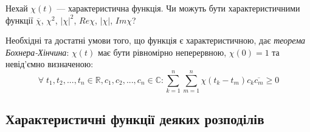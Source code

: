 \begin{exercise}
    Нехай $\chi(t)$ --- характеристична функція. Чи можуть бути характеристичними функції $\overline{\chi}$, $\chi^2$, $|\chi|^2$, ${Re}\chi$, $|\chi|$, ${Im}\chi$? 
\end{exercise}

Необхідні та достатні умови того, що функція є характеристичною, дає
\emph{теорема Бохнера-Хінчина}: $\chi(t)$ має бути рівномірно неперервною, $\chi(0) = 1$ та 
невід'ємно визначеною: $$
    \forall \; t_1, t_2, ..., t_n \in \mathbb{R}, c_1, c_2, ..., c_n \in \mathbb{C}: 
    \sum\limits_{k=1}^n {\sum\limits_{m=1}^n \chi(t_k - t_m) c_k \overline{c_m}} \geq 0
$$

\subsection{Характеристичні функції деяких розподілів}
